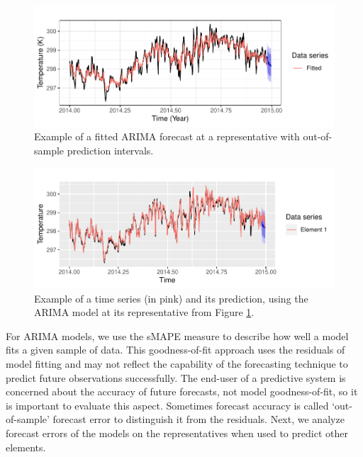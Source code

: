 \begin{figure}[!ht]
	\centering
	\includegraphics[scale=1]{../Figures/medoid_forecast_fitted}
	\caption{Example of a fitted ARIMA forecast at a representative with out-of-sample prediction intervals.}
	\label{Fig:ModelFinalToForecast}
\end{figure}

\begin{figure}[!ht]
	\centering
	\includegraphics[scale=1]{../Figures/forecast_element1}
	\caption{Example of a time series (in pink) and its prediction, using the ARIMA model at its representative from Figure \ref{Fig:ModelFinalToForecast}.}
	\label{Fig:ForecastElement1}
\end{figure}

For ARIMA models, we use the sMAPE measure to describe how well a model fits a given sample of data. This goodness-of-fit approach uses the residuals of model fitting and may not reflect the capability of the forecasting technique to predict future observations \cite{Montgomery2015} successfully. The end-user of a predictive system is concerned about the accuracy of future forecasts, not model goodness-of-fit, so it is important to evaluate this aspect. Sometimes forecast accuracy is called `out-of-sample' forecast error to distinguish it from the residuals. Next, we analyze forecast errors of the models on the representatives when used to predict other elements.

